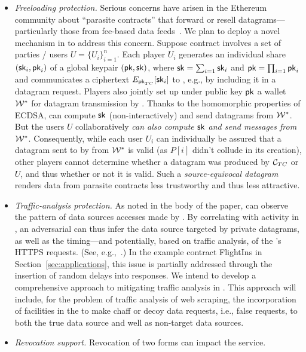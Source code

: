 \begin{itemize}
\item{\em Freeloading protection.} Serious concerns have  arisen in the Ethereum community about ``parasite contracts'' that forward or resell datagrams---particularly those from fee-based data feeds~\cite{parasite}. We plan to deploy a novel mechanism in \tc to address this concern. Suppose contract \reqcont involves a set of parties / users $U = \{U_i\}_{i=1}^n$. Each player $U_i$ generates an individual share $({\sf sk}_i, {\sf pk}_i)$ of a global keypair $({\sf pk}, {\sf sk})$, where ${\sf sk} = \sum_{i=1} {\sf sk}_i$ and ${\sf pk} = \prod_{i=1} {\sf pk}_i$ and communicates a ciphertext $E_{{\sf pk}_{TC}}[{\sf sk}_i]$ to \tcont, e.g., by including it in a datagram request. Players also jointly set  up under public key ${\sf pk}$ a wallet ${\cal W}^*$ for datagram transmission by \tcont. Thanks to the homomorphic properties of ECDSA, \tcont can compute ${\sf sk}$ (non-interactively) and send datagrams from ${\cal W}^*$. But the users $U$ collaboratively \emph{can also compute ${\sf sk}$ and send messages from ${\cal W}^*$}. Consequently, while each user $U_i$ can individually be assured that a datagram sent to \reqcont by \tcont from ${\cal W}^*$ is valid (as $P[i]$ didn't collude in its creation), other players cannot determine whether a datagram was produced by ${\cal C}_{TC}$ or $U$, and thus whether or not it is valid. Such a \emph{source-equivocal datagram} renders data from parasite contracts less trustworthy and thus less attractive. 
\item{\em Traffic-analysis protection.} As noted in the body of the paper, \medname can observe the pattern of data sources accesses made by \tc. By correlating with activity in \tcont, an adversarial \medname can thus infer the data source targeted by private datagrams, as well as the timing---and potentially, based on traffic analysis, of the \encname's HTTPS requests. (See, e.g.,~\cite{chen2010side}.) In the example contract {\sf FlightIns} in Section~\ref{sec:applications}, this issue is partially addressed through the insertion of random delays into \tc responses. We intend to develop a comprehensive approach to mitigating traffic analysis in \tc. This approach will include, for the problem of traffic analysis of web scraping, the incorporation of facilities in the \encname to make chaff or decoy data requests, i.e., false requests, to both the true data source and well as non-target data sources. 

\item{\em Revocation support.} Revocation of two forms can impact the \tc service. 


\end{itemize}
